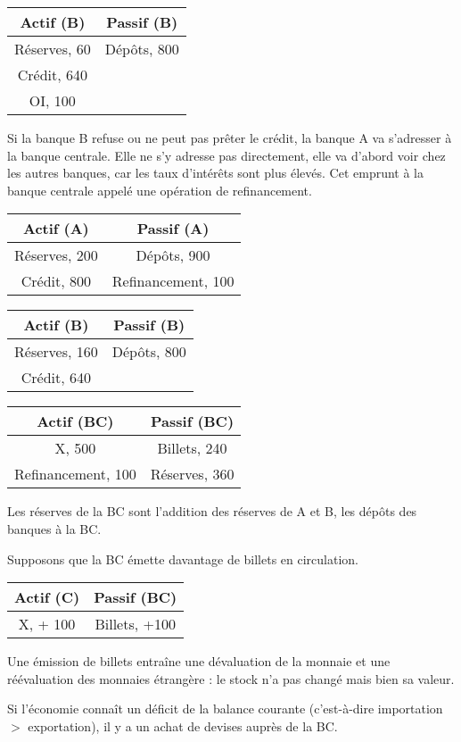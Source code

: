 	\begin{tabular}{c|c}
	Actif (B) & Passif (B) \\ 
	\hline 
	Réserves, 60 & Dépôts, 800 \\ 
	Crédit, 640 &  \\
	OI, 100 &
	\end{tabular}
	
	Si la banque B refuse ou ne peut pas prêter le crédit, la banque A va s'adresser à la banque centrale. Elle ne s'y adresse pas directement, elle va d'abord voir chez les autres banques, car les taux d'intérêts sont plus élevés. Cet emprunt à la banque centrale appelé une opération de refinancement.
	
	\begin{tabular}{c|c}
	Actif (A) & Passif (A) \\ 
	\hline 
	Réserves, 200 & Dépôts, 900 \\ 
	Crédit, 800 &   Refinancement, 100
	\end{tabular}
	
		
	\begin{tabular}{c|c}
	Actif (B) & Passif (B) \\ 
	\hline 
	Réserves, 160 & Dépôts, 800 \\ 
	Crédit, 640 &
	\end{tabular}
	
	
	\begin{tabular}{c|c}
	Actif (BC) & Passif (BC) \\ 
	\hline 
	X, 500 & Billets, 240 \\ 
	Refinancement, 100 & Réserves, 360 \\
	\end{tabular}
	
	Les réserves de la BC sont l'addition des réserves de A et B, les dépôts des banques à la BC.
	
	Supposons que la BC émette davantage de billets en circulation.
	
	\begin{tabular}{c|c}
	Actif (C) & Passif (BC) \\ 
	\hline 
	X, + 100 & Billets, +100 
	\end{tabular}
	
	Une émission de billets entraîne une dévaluation de la monnaie et une réévaluation des monnaies étrangère : le stock n'a pas changé mais bien sa valeur.
	
	Si l'économie connaît un déficit de la balance courante (c'est-à-dire importation $>$ exportation), il y a un achat de devises auprès de la BC.
	
